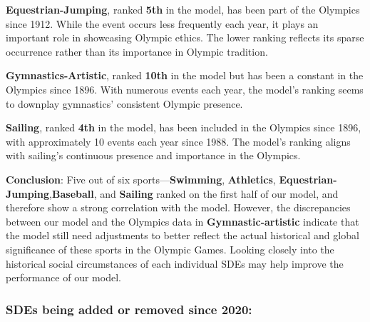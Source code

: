 \documentclass[12pt]{article}
\begin{document}

\textbf{Equestrian-Jumping}, ranked \textbf{5th} in the model, has been part of the Olympics since 1912. While the event occurs less frequently each year, it plays an important role in showcasing Olympic ethics. The lower ranking reflects its sparse occurrence rather than its importance in Olympic tradition.

\textbf{Gymnastics-Artistic}, ranked \textbf{10th} in the model but has been a constant in the Olympics since 1896. With numerous events each year, the model’s ranking seems to downplay gymnastics' consistent Olympic presence.

\textbf{Sailing}, ranked \textbf{4th} in the model, has been included in the Olympics since 1896, with approximately 10 events each year since 1988. The model’s ranking aligns with sailing’s continuous presence and importance in the Olympics.

\textbf{Conclusion}: Five out of six sports—\textbf{Swimming}, \textbf{Athletics}, \textbf{Equestrian-Jumping},\textbf{Baseball}, and \textbf{Sailing} ranked on the first half of our model, and therefore show a strong correlation with the model. However, the discrepancies between our model and the Olympics data in \textbf{Gymnastic-artistic} indicate that the model still need adjustments to better reflect the actual historical and global significance of these sports in the Olympic Games. Looking closely into the historical social circumstances of each individual SDEs may help improve the performance of our model.

\subsubsection{SDEs being added or removed since 2020:}
\end{document}
